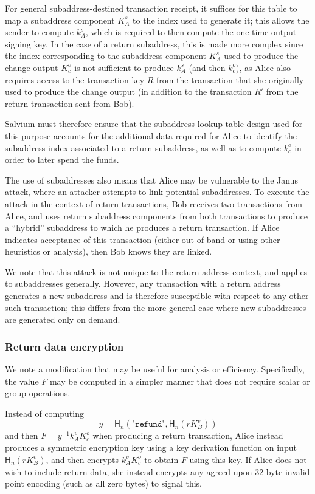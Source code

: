 \documentclass{article}
\newcommand{\hash}{\mathsf{H}_n}
\begin{document}
For general subaddress-destined transaction receipt, it suffices for this table to map a subaddress component $K_A^s$ to the index used to generate it; this allows the sender to compute $k_A^s$, which is required to then compute the one-time output signing key.
In the case of a return subaddress, this is made more complex since the index corresponding to the subaddress component $K_A^s$ used to produce the change output $K_c^o$ is not sufficient to produce $k_A^s$ (and then $k_c^o$), as Alice also requires access to the transaction key $R$ from the transaction that she originally used to produce the change output (in addition to the transaction $R'$ from the return transaction sent from Bob).

Salvium must therefore ensure that the subaddress lookup table design used for this purpose accounts for the additional data required for Alice to identify the subaddress index associated to a return subaddress, as well as to compute $k_c^o$ in order to later spend the funds.

The use of subaddresses also means that Alice may be vulnerable to the Janus attack, where an attacker attempts to link potential subaddresses.
To execute the attack in the context of return transactions, Bob receives two transactions from Alice, and uses return subaddress components from both transactions to produce a ``hybrid'' subaddress to which he produces a return transaction.
If Alice indicates acceptance of this transaction (either out of band or using other heuristics or analysis), then Bob knows they are linked.

We note that this attack is not unique to the return address context, and applies to subaddresses generally.
However, any transaction with a return address generates a new subaddress and is therefore susceptible with respect to any other such transaction; this differs from the more general case where new subaddresses are generated only on demand.


\subsubsection{Return data encryption}

We note a modification that may be useful for analysis or efficiency.
Specifically, the value $F$ may be computed in a simpler manner that does not require scalar or group operations.

Instead of computing
$$y = \hash\left( \texttt{"refund"}, \hash(r K_B^v) \right)$$
and then $F = y^{-1} k_A^v K_c^o$ when producing a return transaction, Alice instead produces a symmetric encryption key using a key derivation function on input $\hash(r K_B^v)$, and then encrypts $k_A^v K_c^o$ to obtain $F$ using this key.
If Alice does not wish to include return data, she instead encrypts any agreed-upon 32-byte invalid point encoding (such as all zero bytes) to signal this.
\end{document}
